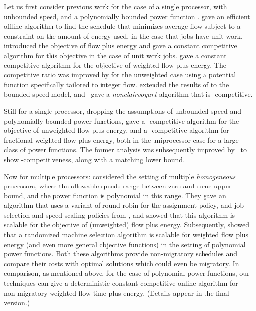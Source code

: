 \documentclass[11pt]{article}
\begin{document}
Let us first consider previous work for the case of a single processor,
with unbounded speed, and a polynomially bounded power function .  \cite{PUW} gave an efficient offline algorithm to find the
schedule that minimizes average flow subject to a constraint on the
amount of energy used, in the case that jobs have unit work. \cite{AF}
introduced the objective of flow plus energy and gave a constant
competitive algorithm for this objective in the case of unit
work jobs. \cite{BPS} gave a constant competitive algorithm for the
objective of weighted flow plus energy.  The competitive ratio was
improved by \cite{LLTW08} for the unweighted case using a potential
function specifically tailored to integer flow. \cite{BCLL08} extended
the results of \cite{BPS} to the bounded speed model,
and~\cite{STACS2009} gave a \emph{nonclairvoyant} algorithm that is
-competitive.

Still for a single processor, dropping the assumptions of unbounded
speed and polynomially-bounded power functions, \cite{BCP} gave a
-competitive algorithm for the objective of unweighted flow plus
energy, and a -competitive algorithm for fractional weighted flow
plus energy, both in the uniprocessor case for a large class of power
functions.  The former analysis was subsequently improved
by~\cite{Lachlan2009} to show -competitiveness, along with a matching
lower bound.

Now for multiple processors:
\cite{Lam08} considered the setting of multiple \emph{homogeneous}
processors, where the allowable speeds range between zero and some upper
bound, and the power function is polynomial in this range.  They gave an
algorithm that uses a variant of round-robin for the assignment
policy, and job selection and speed scaling policies from
\cite{BPS}, and showed that this algorithm is scalable for the objective 
of (unweighted) flow plus energy.
Subsequently, \cite{GNS09} showed that a randomized machine selection
algorithm is scalable for weighted flow plus energy (and even more
general objective functions) in the setting of polynomial power 
functions. Both these algorithms provide non-migratory schedules and 
compare their costs with optimal solutions which could even be migratory. 
In comparison, as mentioned above, for the case of polynomial power 
functions, our techniques can give a deterministic constant-competitive 
online algorithm for non-migratory weighted flow time plus energy.
(Details appear in the final version.)
\end{document}
